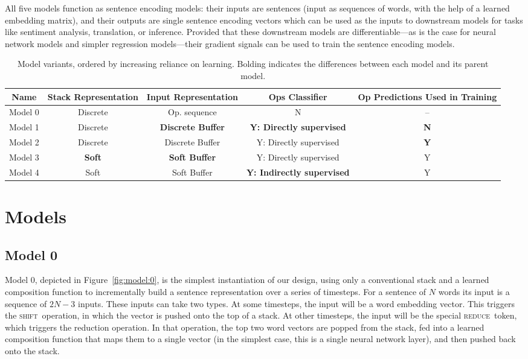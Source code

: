 \documentclass[11pt,letterpaper]{article}
\newcommand{\shift}{\textsc{shift}}
\newcommand{\reduce}{\textsc{reduce}}
\begin{document}
All five models function as sentence encoding models: their inputs are sentences (input as sequences of words, with the help of a learned embedding matrix), and their outputs are single sentence encoding vectors which can be used as the inputs to downstream models for tasks like sentiment analysis, translation, or inference. Provided that these downstream models are differentiable---as is the case for neural network models and simpler regression models---their gradient signals can be used to train the sentence encoding models.

\begin{table*}[t]
  \centering\small
  \begin{tabular}{ccccc} 
    \toprule
    Name & Stack Representation & Input Representation & Ops Classifier & Op Predictions Used in Training \\ 
    \midrule
Model 0 & Discrete & Op. sequence & N & -- \\
Model 1 & Discrete & \bf Discrete Buffer & \bf Y: Directly supervised & \bf N \\
Model 2 & Discrete & Discrete Buffer & Y: Directly supervised & \bf Y \\
Model 3 & \bf Soft & \bf Soft Buffer & Y: Directly supervised & Y \\
Model 4 & Soft & Soft Buffer & \bf Y: Indirectly supervised & Y \\
    \bottomrule
  \end{tabular}
  \protect\caption{\protect\label{models-table}Model variants, ordered by increasing reliance on learning. Bolding indicates the differences between each model and its parent model.} 
\end{table*}

\section{Models}

\subsection{Model 0}

Model 0, depicted in Figure~\ref{fig:model:0}, is the simplest instantiation of our design, using only a conventional stack and a learned composition function to incrementally build a sentence representation over a series of timesteps. For a sentence of $N$ words its input is a sequence of $2N-3$ inputs. These inputs can take two types. At some timesteps, the input will be a word embedding vector. This triggers the \shift~operation, in which the vector is pushed onto the top of a stack. At other timesteps, the input will be the special \reduce~token, which triggers the reduction operation. In that operation, the top two word vectors are popped from the stack, fed into a learned composition function that maps them to a single vector (in the simplest case, this is a single neural network layer), and then pushed back onto the stack.
\end{document}
